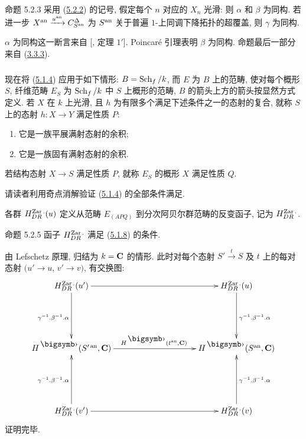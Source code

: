 \begin{enonce*}{命题 5.2.3}
采用 (\hyperref[Vbis.subsubsec5.2.2]{5.2.2}) 的记号,
假定每个 $n$ 对应的 $X_n$ 光滑: 则 $\alpha$ 和 $\beta$ 为同构.
若进一步 $X^{\operatorname{an}} \xrightarrow{u^{\operatorname{an}}}C^{\Delta}_{S^{\operatorname{an}}}$
为 $S^{\operatorname{an}}$ 关于普遍 $1$-上同调下降拓扑的超覆盖, 则 $\gamma$ 为同构.
\end{enonce*}

$\alpha$ 为同构这一断言来自 [\cite{sga4.exp.Vbis.bib.6}, 定理 $1'$].
Poincar\'e 引理表明 $\beta$ 为同构.
命题最后一部分来自 (\hyperref[Vbis.thm3.3.3]{3.3.3}).

\setcounter{subsubsection}{3}
\subsubsection{}
现在将 (\hyperref[Vbis.subsubsec5.1.4]{5.1.4})
应用于如下情形: $B = \operatorname{Sch}_f /k$, 而 $E$ 为 $B$ 上的范畴,
使对每个概形 $S$, 纤维范畴 $E_S$ 为 $\operatorname{Sch}_f /k$ 中 $S$ 上概形的范畴,
$B$ 的箭头上方的箭头按显然方式定义.
若 $X$ 在 $k$ 上光滑, 且 $h$ 为有限多个满足下述条件之一的态射的复合,
就称 $S$ 上的态射 $h : X \to Y$ 满足性质 $P$:
\begin{enumerate}
\renewcommand{\theenumi}{\roman{enumi}}
\renewcommand{\labelenumi}{(\theenumi)}
\item 它是一族平展满射态射的余积;
\item 它是一族固有满射态射的余积.
\end{enumerate}
若结构态射 $X \to S$ 满足性质 $P$, 就称 $E_S$ 的概形 $X$ 满足性质 $Q$.

请读者利用奇点消解验证 (\hyperref[Vbis.subsubsec5.1.4]{5.1.4}) 的全部条件满足.

各群\pageoriginale{} $H^{\operatorname{Zar}.}_{DR}(u)$
定义从范畴 $E_{(APQ)}$ 到分次阿贝尔群范畴的反变函子, 记为 $H^{\operatorname{Zar}.}_{DR}$.

\begin{enonce*}{命题 5.2.5}
函子 $H^{\operatorname{Zar}.}_{DR}$ 满足 (\hyperref[Vbis.prop5.1.8]{5.1.8}) 的条件.
\end{enonce*}

由 Lefschetz 原理, 归结为 $k = \mathbf{C}$ 的情形.
此时对每个态射 $S'\xrightarrow{t} S$ 及 $t$ 上的每对态射 $(u'\to u$, $v'\to v)$,
有交换图:
\[
\xymatrix@C=3.5cm@R=2cm{
H^{\Zar.}_{DR}(u') \ar[r] \ar[d]_{\gamma^{-1}.\beta^{-1}.\alpha}&  H_{DR}^{\Zar.}(u)\ar[d]^{\gamma^{-1}.\beta^{-1}.\alpha}\\
H^{\bigdot}(S'^{\an},\CC)
\ar[r]^{H^{\bigdot}(t^{\an},\CC)}
& H^{\bigdot}(S^{\an},
\CC) \\
H^{\Zar.}_{DR}(v') \ar[r] \ar[u]^{\gamma^{-1}.\beta^{-1}.\alpha}& H_{DR}^{\Zar.}(v) \ar[u]_{\gamma^{-1}.\beta^{-1}.\alpha}
}
\]
证明完毕.

